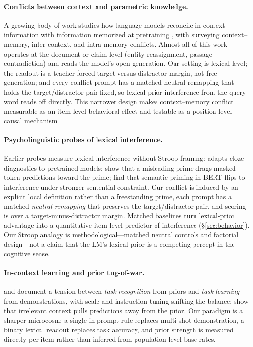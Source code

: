 \documentclass[11pt]{article}
\begin{document}
\paragraph{Conflicts between context and parametric knowledge.}
A growing body of work studies how language models reconcile in-context information with
information memorized at pretraining \citep{longpre2021entity, xie2024knowledge,
kortukov2024studying}, with \citet{xu2024knowledge} surveying context--memory, inter-context,
and intra-memory conflicts. Almost all of this work operates at the document or claim level
(entity reassignment, passage contradiction) and reads the model's open generation. Our
setting is lexical-level; the readout is a teacher-forced target-versus-distractor margin,
not free generation; and every conflict prompt has a matched neutral remapping that holds the
target/distractor pair fixed, so lexical-prior interference from the query word reads off
directly. This narrower design makes context--memory conflict measurable as an item-level
behavioral effect and testable as a position-level causal mechanism.

\paragraph{Psycholinguistic probes of lexical interference.}
Earlier probes measure lexical interference without Stroop framing:
\citet{ettinger2020bert} adapts cloze diagnostics to pretrained models;
\citet{kassner2020negated} show that a misleading prime drags masked-token predictions toward
the prime; \citet{misra2020priming} find that semantic priming in BERT flips to interference
under stronger sentential constraint. Our conflict is induced by an explicit local definition
rather than a freestanding prime, each prompt has a matched \emph{neutral remapping} that
preserves the target/distractor pair, and scoring is over a target-minus-distractor margin.
Matched baselines turn lexical-prior advantage into a quantitative item-level predictor of
interference (\S\ref{sec:behavior}). Our Stroop analogy is methodological---matched neutral
controls and factorial design---not a claim that the LM's lexical prior is a competing
percept in the cognitive sense.

\paragraph{In-context learning and prior tug-of-war.}
\citet{wei2023larger} and \citet{pan2023incontext} document a tension between
\emph{task recognition} from priors and \emph{task learning} from demonstrations, with scale
and instruction tuning shifting the balance; \citet{shi2023distracted} show that irrelevant
context pulls predictions away from the prior. Our paradigm is a sharper microcosm: a single
in-prompt rule replaces multi-shot demonstration, a binary lexical readout replaces task
accuracy, and prior strength is measured directly per item rather than inferred from
population-level base-rates.
\end{document}
